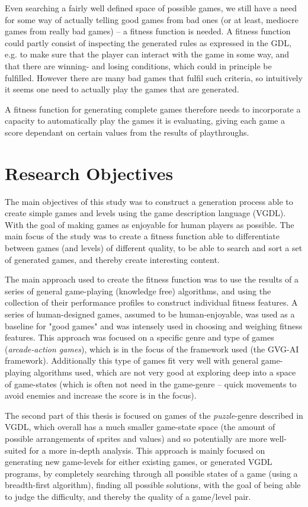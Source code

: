 \documentclass[a4paper,titlepage,final]{report}
\begin{document}
Even searching a fairly well defined space of possible games, we still have a need for some way of actually telling good games from bad ones (or at least, mediocre games from really bad games) -- a fitness function is needed. 
A fitness function could partly consist of inspecting the generated rules as expressed in the GDL, e.g. to make sure that the player can interact with the game in some way, and that there are winning- and losing conditions, which could in principle be fulfilled. 
However there are many bad games that fulfil such criteria, so intuitively it seems one need to actually play the games that are generated. 

A fitness function for generating complete games therefore needs to incorporate a capacity to automatically play the games it is evaluating, giving each game a score dependant on certain values from the results of playthroughs.


\section{Research Objectives}
\label{sec_researchobj}
The main objectives of this study was to construct a generation process able to create simple games and levels using the game description language (VGDL). 
With the goal of making games as enjoyable for human players as possible.
The main focus of the study was to create a fitness function able to differentiate between games (and levels) of different quality, to be able to search and sort a set of generated games, and thereby create interesting content.

The main approach used to create the fitness function was to use the results of a series of general game-playing (knowledge free) algorithms, and using the collection of their performance profiles to construct individual fitness features.
A series of human-designed games, assumed to be human-enjoyable, was used as a baseline for "good games" and was intensely used in choosing and weighing fitness features.
This approach was focused on a specific genre and type of games (\textit{arcade-action games}), which is in the focus of the framework used (the GVG-AI framework). 
Additionally this type of games fit very well with general game-playing algorithms used, which are not very good at exploring deep into a space of game-states (which is often not need in the game-genre -- quick movements to avoid enemies and increase the score is in the focus).

The second part of this thesis is focused on games of the \textit{puzzle}-genre described in VGDL, which overall has a much smaller game-state space (the amount of possible arrangements of sprites and values) and so potentially are more well-suited for a more in-depth analysis.
This approach is mainly focused on generating new game-levels for either existing games, or generated VGDL programs, by completely searching through all possible states of a game (using a breadth-first algorithm), finding all possible solutions, with the goal of being able to judge the difficulty, and thereby the quality of a game/level pair.
\end{document}
